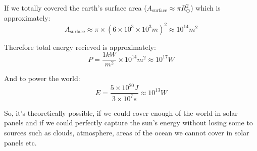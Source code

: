 If we totally covered the earth's surface area ($A_{\text{surface}} \approx \pi R_{\odot}^2$) which is approximately:
\[
    A_{\text{surface}} \approx \pi \times (6\times10^3\times10^3m)^2 \approx 10^{14}m^2
\]

Therefore total energy recieved is approximately:
\[
    P = \frac{1kW}{m^2} \times 10^{14}m^2 \approx 10^{17}W
\]

And to power the world:
\[
    E = \frac{5 \times 10^{20}J}{3 \times 10^7s} \approx 10^{13}W
\]

So, it's theoretically possible, if we could cover enough of the world in solar panels and if we could perfectly capture the sun's energy without losing some to sources such as clouds, atmosphere, areas of the ocean we cannot cover in solar panels etc.

